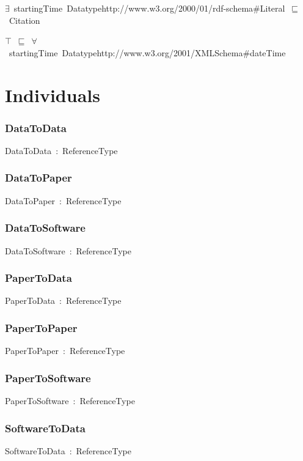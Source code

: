 \documentclass{article}
\begin{document}
\ensuremath{\exists}~startingTime~Datatypehttp://www.w3.org/2000/01/rdf-schema#Literal~\ensuremath{\sqsubseteq}~Citation

\ensuremath{\top}~\ensuremath{\sqsubseteq}~\ensuremath{\forall}~startingTime~Datatypehttp://www.w3.org/2001/XMLSchema#dateTime

\section*{Individuals}\subsubsection*{DataToData}

DataToData~:~ReferenceType

\subsubsection*{DataToPaper}

DataToPaper~:~ReferenceType

\subsubsection*{DataToSoftware}

DataToSoftware~:~ReferenceType

\subsubsection*{PaperToData}

PaperToData~:~ReferenceType

\subsubsection*{PaperToPaper}

PaperToPaper~:~ReferenceType

\subsubsection*{PaperToSoftware}

PaperToSoftware~:~ReferenceType

\subsubsection*{SoftwareToData}

SoftwareToData~:~ReferenceType
\end{document}
